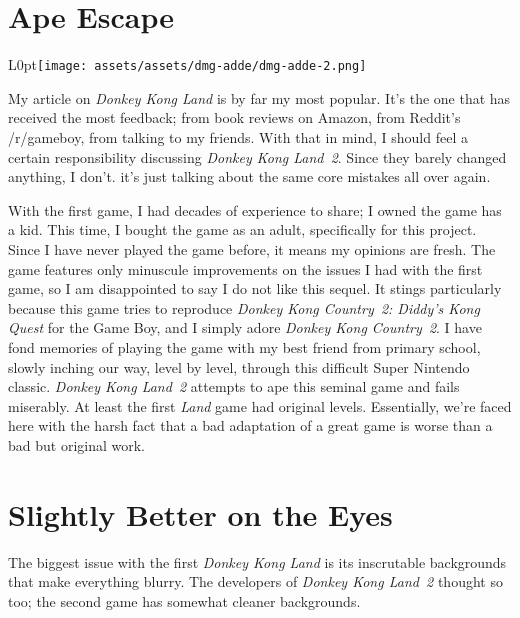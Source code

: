 \documentclass{book}
\begin{document}
\newpage\FloatBarrier\section*{Ape Escape}
\begin{wrapfigure}{L}{0pt}{\texttt{[image: assets/assets/dmg-adde/dmg-adde-2.png]}}\end{wrapfigure}\noindent
My article on \emph{Donkey Kong Land} is by far my most popular. It’s the one that has received the most feedback; from book reviews on Amazon, from Reddit’s /r/gameboy, from talking to my friends. With that in mind, I should feel a certain responsibility discussing \emph{Donkey Kong Land~2}. Since they barely changed anything, I don’t. it’s just talking about the same core mistakes all over again.\par
With the first game, I had decades of experience to share; I owned the game has a kid. This time, I bought the game as an adult, specifically for this project. Since I have never played the game before, it means my opinions are fresh. The game features only minuscule improvements on the issues I had with the first game, so I am disappointed to say I do not like this sequel. It stings particularly because this game tries to reproduce \emph{Donkey Kong Country~2: Diddy’s Kong Quest} for the Game Boy, and I simply adore \emph{Donkey Kong Country~2}. I have fond memories of playing the game with my best friend from primary school, slowly inching our way, level by level, through this difficult Super Nintendo classic. \emph{Donkey Kong Land~2} attempts to ape this seminal game and fails miserably. At least the first \emph{Land} game had original levels. Essentially, we’re faced here with the harsh fact that a bad adaptation of a great game is worse than a bad but original work.\par
\FloatBarrier\section*{Slightly Better on the Eyes}
The biggest issue with the first \emph{Donkey Kong Land} is its inscrutable backgrounds that make everything blurry. The developers of \emph{Donkey Kong Land~2} thought so too; the second game has somewhat cleaner backgrounds.\par
\FloatBarrier\vspace{\baselineskip}\centering
\begin{minipage}{0.45\linewidth}\end{minipage}\vspace{2pt}
\end{document}
